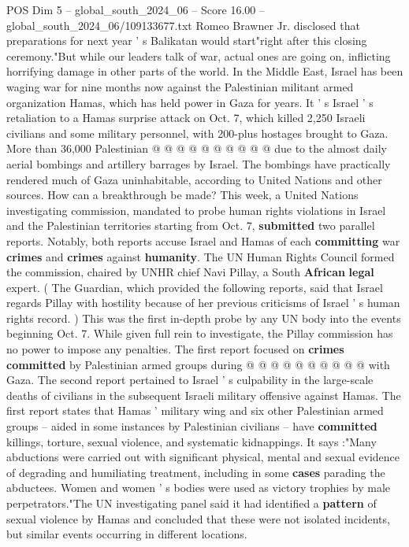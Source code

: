 \begin{textsample}{POS Dim 5 – global\_south\_2024\_06 – Score 16.00 – global\_south\_2024\_06/109133677.txt}
Romeo Brawner Jr. disclosed that preparations for next year ' s Balikatan would start"right after this closing ceremony."But while our leaders talk of war, actual ones are going on, inflicting horrifying damage in other parts of the world.
In the Middle East, Israel has been waging war for nine months now against the Palestinian militant armed organization Hamas, which has held power in Gaza for years.
It ' s Israel ' s retaliation to a Hamas surprise attack on Oct. 7, which killed 2,250 Israeli civilians and some military personnel, with 200-plus hostages brought to Gaza.
More than 36,000 Palestinian @ @ @ @ @ @ @ @ @ @ due to the almost daily aerial bombings and artillery barrages by Israel.
The bombings have practically rendered much of Gaza uninhabitable, according to United Nations and other sources.
How can a breakthrough be made?
This week, a United Nations investigating commission, mandated to probe human rights violations in Israel and the Palestinian territories starting from Oct. 7, \textbf{submitted} two parallel reports.
Notably, both reports accuse Israel and Hamas of each \textbf{committing} war \textbf{crimes} and \textbf{crimes} against \textbf{humanity}.
The UN Human Rights Council formed the commission, chaired by UNHR chief Navi Pillay, a South \textbf{African} \textbf{legal} expert. ( The Guardian, which provided the following reports, said that Israel regards Pillay with hostility because of her previous criticisms of Israel ' s human rights record. ) This was the first in-depth probe by any UN body into the events beginning Oct. 7.
While given full rein to investigate, the Pillay commission has no power to impose any penalties.
The first report focused on \textbf{crimes} \textbf{committed} by Palestinian armed groups during @ @ @ @ @ @ @ @ @ @ with Gaza.
The second report pertained to Israel ' s culpability in the large-scale deaths of civilians in the subsequent Israeli military offensive against Hamas.
The first report states that Hamas ' military wing and six other Palestinian armed groups -- aided in some instances by Palestinian civilians -- have \textbf{committed} killings, torture, sexual violence, and systematic kidnappings.
It says :"Many abductions were carried out with significant physical, mental and sexual evidence of degrading and humiliating treatment, including in some \textbf{cases} parading the abductees.
Women and women ' s bodies were used as victory trophies by male perpetrators."The UN investigating panel said it had identified a \textbf{pattern} of sexual violence by Hamas and concluded that these were not isolated incidents, but similar events occurring in different locations.

\end{textsample}
